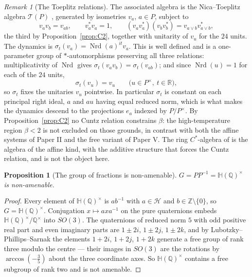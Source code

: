 \documentclass[11pt]{amsart}
\numberwithin{equation}{section}
\newtheorem{proposition}[theorem]{Proposition}
\theoremstyle{definition}
\theoremstyle{remark}
\newtheorem{remark}[theorem]{Remark}
\newcommand{\Z}{\mathbb{Z}}
\newcommand{\Q}{\mathbb{Q}}
\newcommand{\R}{\mathbb{R}}
\newcommand{\HH}{\mathbb{H}}
\newcommand{\cH}{\mathcal{H}}
\newcommand{\cT}{\mathcal{T}}
\newcommand{\Nrd}{\operatorname{Nrd}}
\begin{document}
\begin{remark}[The Toeplitz relations]\label{rem:relations}
The associated algebra is the Nica--Toeplitz algebra $\cT(P)$ \cite{Nica,LacaRaeburn},
generated by isometries $v_a$, $a\in P$, subject to
\[
v_av_b=v_{ab},\qquad v_a^*v_a=1,\qquad (v_av_a^*)(v_bv_b^*)=v_{a\vee b}v_{a\vee b}^*,
\]
the third by Proposition~\ref{prop:C2}, together with unitarity of $v_u$ for the $24$ units.
The dynamics is $\sigma_t(v_a)=\Nrd(a)^{it}v_a$. This is well defined and is a one-parameter
group of $*$-automorphisms preserving all three relations: multiplicativity of $\Nrd$ gives
$\sigma_t(v_av_b)=\sigma_t(v_{ab})$; and since $\Nrd(u)=1$ for each of the $24$ units,
\[
\sigma_t(v_u)=v_u\qquad\bigl(u\in P^\times,\ t\in\R\bigr),
\]
so $\sigma_t$ fixes the unitaries $v_u$ pointwise. In particular $\sigma_t$ is constant on
each principal right ideal, $a$ and $au$ having equal reduced norm, which is what makes the
dynamics descend to the projections $e_a$ indexed by $P/P^\times$. By
Proposition~\ref{prop:C2} no Cuntz relation constrains $\beta$: the
high-temperature region $\beta<2$ is not excluded on those grounds, in contrast with both the
affine systems of Paper II and the free variant of Paper V. The ring $C^*$-algebra of
\cite{CL} is the algebra of the affine kind, with the additive structure that forces the
Cuntz relation, and is not the object here.
\end{remark}

\begin{proposition}[The group of fractions is non-amenable]\label{prop:nonamen}
$G=PP^{-1}=\HH(\Q)^\times$ is non-amenable.
\end{proposition}

\begin{proof}
Every element of $\HH(\Q)^\times$ is $ab^{-1}$ with $a\in\cH$ and $b\in\Z\setminus\{0\}$, so
$G=\HH(\Q)^\times$. Conjugation $x\mapsto axa^{-1}$ on the pure quaternions embeds
$\HH(\Q)^\times/\Q^\times$ into $SO(3)$. The quaternions of reduced norm $5$ with odd
positive real part and even imaginary parts are $1\pm2i$, $1\pm2j$, $1\pm2k$, and by
Lubotzky--Phillips--Sarnak \cite[\S3]{LPS} the elements $1+2i$, $1+2j$, $1+2k$ generate a
free group of rank three modulo the centre --- their images in $SO(3)$ are the rotations by
$\arccos(-\frac35)$ about the three coordinate axes. So $\HH(\Q)^\times$ contains a free
subgroup of rank two and is not amenable.
\end{proof}
\end{document}
